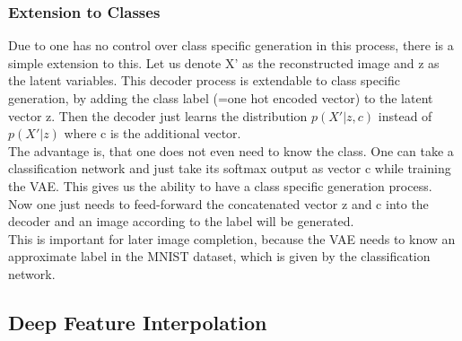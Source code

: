 \documentclass[
     11pt,         %
     a4paper,      %
     oneside,
     ]{article}
\begin{document}
\subsubsection{Extension to Classes}
Due to one has no control over class specific generation in this process, there is a simple extension to this. Let us denote X' as the reconstructed image and z as the latent variables. This decoder process is extendable to class specific generation, by adding the class label (=one hot encoded vector) to the latent vector z. Then the decoder just learns the distribution $p(X'|z,c)$ instead of  $p(X'|z)$ where c is the additional vector.\\
The advantage is, that one does not even need to know the class. One can take a classification network and just take its softmax output as vector c while training the VAE. This gives us the ability to have a class specific generation process. Now one just needs to feed-forward the concatenated vector z and c into the decoder and an image according to the label will be generated.\cite{VAEextension}\\
This is important for later image completion, because the VAE needs to know an approximate label in the MNIST dataset, which is given by the classification network.

\subsection{Deep Feature Interpolation}
\end{document}
